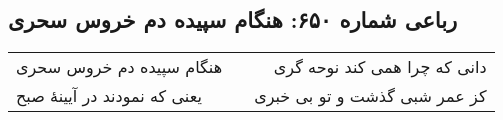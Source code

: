 \begin{center}
\section*{رباعی شماره ۶۵۰: هنگام سپیده دم خروس سحری}
\label{sec:sh650}
\begin{longtable}{l p{0.5cm} r}
هنگام سپیده دم خروس سحری
&&
دانی که چرا همی کند نوحه گری
\\
یعنی که نمودند در آیینهٔ صبح
&&
کز عمر شبی گذشت و تو بی خبری
\\
\end{longtable}
\end{center}

